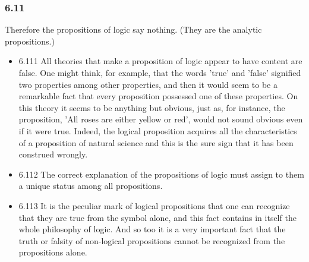 \documentclass[11pt]{article}
\begin{document}
\subsubsection*{6.11}
\label{sec:org613f9cb}
Therefore the propositions of logic say nothing. (They are the
analytic propositions.)
\begin{itemize}
\item 6.111
\label{sec:org1727611}
All theories that make a proposition of logic appear to have content
are false. One might think, for example, that the words 'true' and 'false'
signified two properties among other properties, and then it would seem to
be a remarkable fact that every proposition possessed one of these
properties. On this theory it seems to be anything but obvious, just as,
for instance, the proposition, 'All roses are either yellow or red', would
not sound obvious even if it were true. Indeed, the logical proposition
acquires all the characteristics of a proposition of natural science and
this is the sure sign that it has been construed wrongly.
\item 6.112
\label{sec:org4f3a8ba}
The correct explanation of the propositions of logic must assign to
them a unique status among all propositions.
\item 6.113
\label{sec:org9a81f3c}
It is the peculiar mark of logical propositions that one can
recognize that they are true from the symbol alone, and this fact contains
in itself the whole philosophy of logic. And so too it is a very important
fact that the truth or falsity of non-logical propositions cannot be
recognized from the propositions alone.
\end{itemize}
\end{document}
